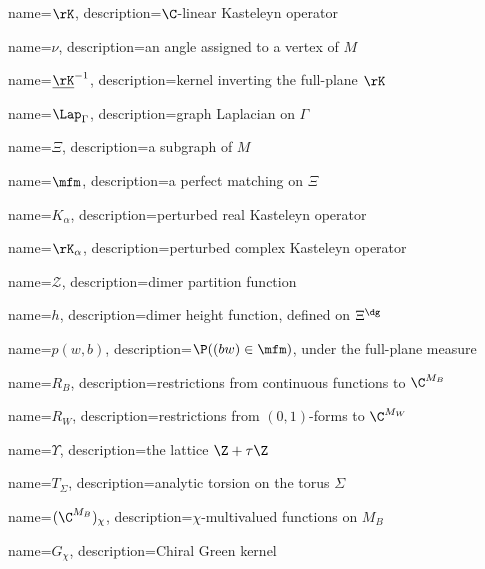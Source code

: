 	{name={\ensuremath{\rK}}, 
	description={$\C$-linear Kasteleyn operator}
}

	{name={\ensuremath{\nu}}, 
	description={an angle assigned to a vertex of $M$}
}

	{name={\ensuremath{\protect\underline{\rK}^{-1}}}, 
	description={kernel inverting the full-plane $\rK$}
}

	{name={\ensuremath{\Lap_\Gamma}}, 
	description={graph Laplacian on $\Gamma$}
}

	{name={\ensuremath{\Xi}}, 
	description={a subgraph of $M$}
}

	{name={\ensuremath{{\mfm}}}, 
	description={a perfect matching on $\Xi$}
}

	{name={\ensuremath{K_\alpha}}, 
	description={perturbed real Kasteleyn operator}
}

	{name={\ensuremath{\rK_\alpha}}, 
	description={perturbed complex Kasteleyn operator}
}

	{name={\ensuremath{{\mathcal Z}}}, 
	description={dimer partition function}
}

	{name={\ensuremath{h}}, 
	description={dimer height function, defined on $\Xi^\dg$}
}

	{name={\ensuremath{p(w,b)}}, 
	description={$\P((bw)\in\mfm)$, under the full-plane measure}
}

	{name={\ensuremath{R_B}}, 
	description={restrictions from continuous functions to $\C^{M_B}$}
}

	{name={\ensuremath{R_W}}, 
	description={restrictions from $(0,1)$-forms to $\C^{M_W}$}
}



	{name={\ensuremath{\Upsilon}}, 
	description={the lattice $\Z+\tau\Z$}
}

	{name={\ensuremath{T_\Sigma}}, 
	description={analytic torsion on the torus $\Sigma$}
}



	{name={\ensuremath{(\C^{M_B})_\chi}}, 
	description={$\chi$-multivalued functions on $M_B$}
}


	{name={\ensuremath{G_\chi}}, 
	description={Chiral Green kernel}
}

